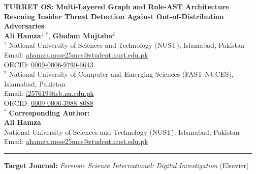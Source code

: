 \documentclass[11pt,a4paper]{article}
\begin{document}
\begin{center}
    {\Large \textbf{TURRET OS: Multi-Layered Graph and Rule-AST Architecture Rescuing Insider Threat Detection Against Out-of-Distribution Adversaries}} \\[1.5em]

    \textbf{Ali Hamza}$^{1,*}$, \textbf{Ghulam Mujtaba}$^2$ \\[1em]

    $^1$ National University of Sciences and Technology (NUST), Islamabad, Pakistan \\
    Email: \href{mailto:ahamza.msse25mcs@student.nust.edu.pk}{ahamza.msse25mcs@student.nust.edu.pk} \\
    ORCID: \href{https://orcid.org/0009-0006-9790-6643}{0009-0006-9790-6643} \\[0.8em]

    $^2$ National University of Computer and Emerging Sciences (FAST-NUCES), Islamabad, Pakistan \\
    Email: \href{mailto:i257619@isb.nu.edu.pk}{i257619@isb.nu.edu.pk} \\
    ORCID: \href{https://orcid.org/0009-0006-3988-8088}{0009-0006-3988-8088} \\[1.5em]

    $^*$ \textbf{Corresponding Author:} \\
    \textbf{Ali Hamza} \\
    National University of Sciences and Technology (NUST), Islamabad, Pakistan \\
    Email: \href{mailto:ahamza.msse25mcs@student.nust.edu.pk}{ahamza.msse25mcs@student.nust.edu.pk}
\end{center}

\vspace{1em}
\hrule
\vspace{1em}

\textbf{Target Journal:} \textit{Forensic Science International: Digital Investigation} (Elsevier)
\end{document}
